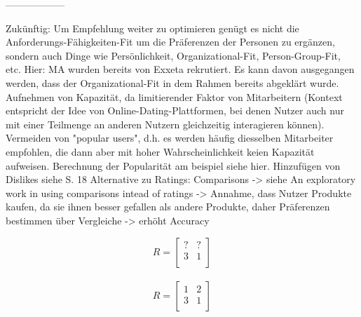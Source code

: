 ------------------

Zukünftig:
Um Empfehlung weiter zu optimieren genügt es nicht die Anforderungs-Fähigkeiten-Fit um die Präferenzen der Personen zu ergänzen, sondern auch Dinge wie Persönlichkeit, Organizational-Fit, Person-Group-Fit, etc.
Hier: MA wurden bereits von Exxeta rekrutiert. Es kann davon ausgegangen werden, dass der Organizational-Fit in dem Rahmen bereits abgeklärt wurde.
Aufnehmen von Kapazität, da limitierender Faktor von Mitarbeitern (Kontext entspricht der Idee von Online-Dating-Plattformen, bei denen Nutzer auch nur mit einer Teilmenge an anderen Nutzern gleichzeitig interagieren können). %
Vermeiden von "popular users", d.h. es werden häufig diesselben Mitarbeiter empfohlen, die dann aber mit hoher Wahrscheinlichkeit keien Kapazität aufweisen. Berechnung der Popularität am beispiel siehe hier. %
Hinzufügen von Dislikes siehe S. 18 %
Alternative zu Ratings: Comparisons -> siehe An exploratory work in using comparisons intead of ratings -> Annahme, dass Nutzer Produkte kaufen, da sie ihnen besser gefallen als andere Produkte, daher Präferenzen bestimmen über Vergleiche -> erhöht Accuracy %


$$
R=\begin{bmatrix}
    ? & ? \\
    3 & 1 \\
\end{bmatrix}
$$\\

$$
R=\begin{bmatrix}
    1 & 2 \\
    3 & 1 \\
\end{bmatrix}
$$\\

